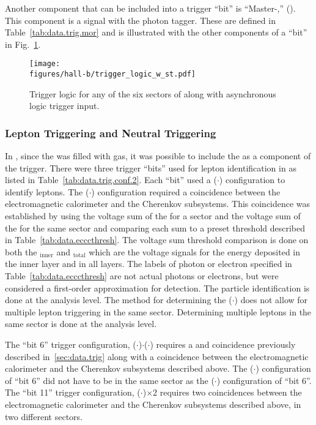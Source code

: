 Another component that can be included into a trigger ``bit'' is ``Master-,'' (). This component is a signal with the photon tagger. These are defined in Table~\ref{tab:data.trig.mor} and is illustrated with the other components of a ``bit'' in Fig.~\ref{fig:clas.daq.triglogic}.
\begin{figure}[h]\begin{center}
\texttt{[image: \\figures/hall-b/trigger\_logic\_w\_st.pdf]}
\caption[Trigger logic for any of the six sectors of  along with  asynchronous logic trigger input]{\label{fig:clas.daq.triglogic}{}Trigger logic for any of the six sectors of  along with  asynchronous logic trigger input.}
\end{center}\end{figure}

\subsubsection{Lepton Triggering and Neutral Triggering}\label{sec.data.trig.lepton}
In , since the  was filled with gas, it was possible to include the  as a component of the trigger. 
There were three trigger ``bits'' used for lepton identification in  as listed in Table~\ref{tab:data.trig.conf.2}. Each ``bit'' used a ($\cdot$) configuration to identify leptons. The ($\cdot$) configuration required a coincidence between the electromagnetic calorimeter and the Cherenkov subsystems. This coincidence was established by using the voltage sum of the  for a sector and the voltage sum of the  for the same sector and comparing each sum to a preset threshold described in Table~\ref{tab:data.ecccthresh}. The  voltage sum threshold comparison is done on both the $_\mathrm{inner}$ and $_{\mathrm{total}}$ which are the  voltage signals for the energy deposited in the inner layer and in all layers. The labels of photon or electron specified in Table~\ref{tab:data.ecccthresh} are not actual photons or electrons, but were considered a first-order approximation for detection. The particle identification is done at the analysis level. The method for determining the ($\cdot$) does not allow for multiple lepton triggering in the same sector. Determining multiple leptons in the same sector is done at the analysis level. 

The ``bit 6'' trigger configuration, ($\cdot$)$\cdot$($\cdot$) requires a  and  coincidence previously described in~\ref{sec:data.trig} along with a coincidence between the electromagnetic calorimeter and the Cherenkov subsystems described above. The ($\cdot$) configuration of ``bit 6'' did not have to be in the same sector as the ($\cdot$) configuration of ``bit 6''. The ``bit 11'' trigger configuration, ($\cdot$)$\times$2 requires two coincidences between the electromagnetic calorimeter and the Cherenkov subsystems described above, in two different sectors. 

